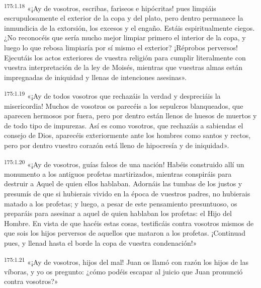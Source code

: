 \par 
\textsuperscript{175:1.18} «¡Ay de vosotros, escribas, fariseos e hipócritas! pues limpiáis escrupulosamente el exterior de la copa y del plato, pero dentro permanece la inmundicia de la extorsión, los excesos y el engaño. Estáis espiritualmente ciegos. ¿No reconocéis que sería mucho mejor limpiar primero el interior de la copa, y luego lo que rebosa limpiaría por sí mismo el exterior? ¡Réprobos perversos! Ejecutáis los actos exteriores de vuestra religión para cumplir literalmente con vuestra interpretación de la ley de Moisés, mientras que vuestras almas están impregnadas de iniquidad y llenas de intenciones asesinas».

\par 
\textsuperscript{175:1.19} «¡Ay de todos vosotros que rechazáis la verdad y despreciáis la misericordia! Muchos de vosotros os parecéis a los sepulcros blanqueados, que aparecen hermosos por fuera, pero por dentro están llenos de huesos de muertos y de todo tipo de impurezas. Así es como vosotros, que rechazáis a sabiendas el consejo de Dios, aparecéis exteriormente ante los hombres como santos y rectos, pero por dentro vuestro corazón está lleno de hipocresía y de iniquidad».

\par 
\textsuperscript{175:1.20} «¡Ay de vosotros, guías falsos de una nación! Habéis construido allí un monumento a los antiguos profetas martirizados, mientras conspiráis para destruir a Aquel de quien ellos hablaban. Adornáis las tumbas de los justos y presumís de que si hubierais vivido en la época de vuestros padres, no hubierais matado a los profetas; y luego, a pesar de este pensamiento presuntuoso, os preparáis para asesinar a aquel de quien hablaban los profetas: el Hijo del Hombre. En vista de que hacéis estas cosas, testificáis contra vosotros mismos de que sois los hijos perversos de aquellos que mataron a los profetas. ¡Continuad pues, y llenad hasta el borde la copa de vuestra condenación!»

\par 
\textsuperscript{175:1.21} «¡Ay de vosotros, hijos del mal! Juan os llamó con razón los hijos de las víboras, y yo os pregunto: ¿cómo podéis escapar al juicio que Juan pronunció contra vosotros?»

